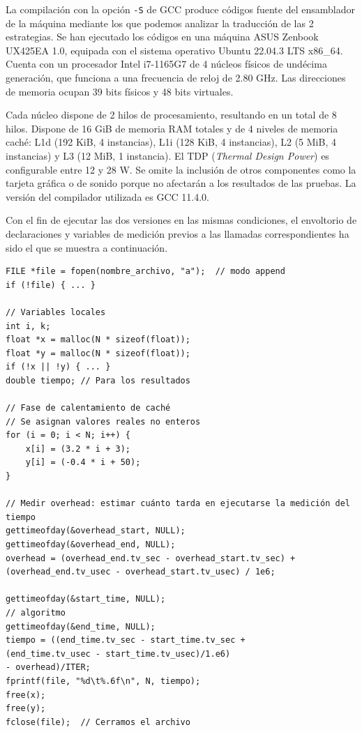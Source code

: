 \documentclass[11pt,a4paper,twoside]{article}
\theoremstyle{definition}
\begin{document}
	La compilación con la opción \texttt{-S} de GCC produce códigos fuente del ensamblador de la máquina mediante los que podemos analizar la traducción de las 2 estrategias. Se han ejecutado los códigos en una máquina ASUS Zenbook UX425EA 1.0, equipada con el sistema operativo Ubuntu 22.04.3 LTS x86\_64. Cuenta con un procesador Intel i7-1165G7 de 4 núcleos físicos de undécima generación, que funciona a una frecuencia de reloj de 2.80 GHz. Las direcciones de memoria ocupan 39 bits físicos y 48 bits virtuales.
	
	Cada núcleo dispone de 2 hilos de procesamiento, resultando en un total de 8 hilos. Dispone de 16 GiB de memoria RAM totales y de 4 niveles de memoria caché: L1d (192 KiB, 4 instancias), L1i (128 KiB, 4 instancias), L2 (5 MiB, 4 instancias) y L3 (12 MiB, 1 instancia). El TDP (\textit{Thermal Design Power}) es configurable entre 12 y 28 W. Se omite la inclusión de otros componentes como la tarjeta gráfica o de sonido porque no afectarán a los resultados de las pruebas. La versión del compilador utilizada es GCC 11.4.0.

	Con el fin de ejecutar las dos versiones en las mismas condiciones, el envoltorio de declaraciones y variables de medición previos a las llamadas correspondientes ha sido el que se muestra a continuación.
	
	\begin{verbatim}
FILE *file = fopen(nombre_archivo, "a");  // modo append
if (!file) { ... }

// Variables locales
int i, k;
float *x = malloc(N * sizeof(float));
float *y = malloc(N * sizeof(float));
if (!x || !y) { ... }
double tiempo; // Para los resultados

// Fase de calentamiento de caché
// Se asignan valores reales no enteros
for (i = 0; i < N; i++) {
	x[i] = (3.2 * i + 3);
	y[i] = (-0.4 * i + 50);
}

// Medir overhead: estimar cuánto tarda en ejecutarse la medición del tiempo
gettimeofday(&overhead_start, NULL);
gettimeofday(&overhead_end, NULL);
overhead = (overhead_end.tv_sec - overhead_start.tv_sec) +
(overhead_end.tv_usec - overhead_start.tv_usec) / 1e6;

gettimeofday(&start_time, NULL);
// algoritmo
gettimeofday(&end_time, NULL);
tiempo = ((end_time.tv_sec - start_time.tv_sec +
(end_time.tv_usec - start_time.tv_usec)/1.e6)
- overhead)/ITER;
fprintf(file, "%d\t%.6f\n", N, tiempo);
free(x);
free(y);
fclose(file);  // Cerramos el archivo
	\end{verbatim}
\end{document}

